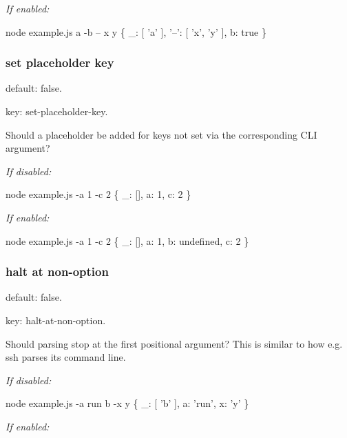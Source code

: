 {\itshape If enabled\+:}


\begin{DoxyCode}
node example.js a -b -- x y
\{ \_: [ 'a' ], '--': [ 'x', 'y' ], b: true \}
\end{DoxyCode}


\subsubsection*{set placeholder key}


\begin{DoxyItemize}
\item default\+: {\ttfamily false}.
\item key\+: {\ttfamily set-\/placeholder-\/key}.
\end{DoxyItemize}

Should a placeholder be added for keys not set via the corresponding C\+LI argument?

{\itshape If disabled\+:}


\begin{DoxyCode}
node example.js -a 1 -c 2
\{ \_: [], a: 1, c: 2 \}
\end{DoxyCode}


{\itshape If enabled\+:}


\begin{DoxyCode}
node example.js -a 1 -c 2
\{ \_: [], a: 1, b: undefined, c: 2 \}
\end{DoxyCode}


\subsubsection*{halt at non-\/option}


\begin{DoxyItemize}
\item default\+: {\ttfamily false}.
\item key\+: {\ttfamily halt-\/at-\/non-\/option}.
\end{DoxyItemize}

Should parsing stop at the first positional argument? This is similar to how e.\+g. {\ttfamily ssh} parses its command line.

{\itshape If disabled\+:}


\begin{DoxyCode}
node example.js -a run b -x y
\{ \_: [ 'b' ], a: 'run', x: 'y' \}
\end{DoxyCode}


{\itshape If enabled\+:}


